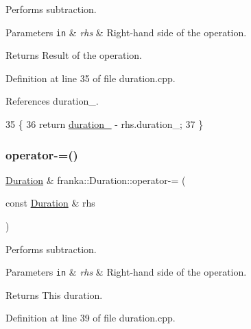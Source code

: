 Performs subtraction.


\begin{DoxyParams}[1]{Parameters}
\mbox{\tt in}  & {\em rhs} & Right-\/hand side of the operation.\\
\hline
\end{DoxyParams}
\begin{DoxyReturn}{Returns}
Result of the operation. 
\end{DoxyReturn}


Definition at line 35 of file duration.\+cpp.



References duration\+\_\+.


\begin{DoxyCode}
35                                                                \{
36   \textcolor{keywordflow}{return} \hyperlink{classfranka_1_1Duration_ae446c403b200f0dbf92fb51ca21e82ff}{duration\_} - rhs.duration\_;
37 \}
\end{DoxyCode}
\mbox{\label{classfranka_1_1Duration_a01e7024d77d75989b389515fdc33db15}} 
\subsubsection{\texorpdfstring{operator-\/=()}{operator-=()}}
{\footnotesize\ttfamily \hyperlink{classfranka_1_1Duration}{Duration} \& franka\+::\+Duration\+::operator-\/= (\begin{DoxyParamCaption}\item[{const \hyperlink{classfranka_1_1Duration}{Duration} \&}]{rhs }\end{DoxyParamCaption})\hspace{0.3cm}{\ttfamily [noexcept]}}

Performs subtraction.


\begin{DoxyParams}[1]{Parameters}
\mbox{\tt in}  & {\em rhs} & Right-\/hand side of the operation.\\
\hline
\end{DoxyParams}
\begin{DoxyReturn}{Returns}
This duration. 
\end{DoxyReturn}


Definition at line 39 of file duration.\+cpp.



